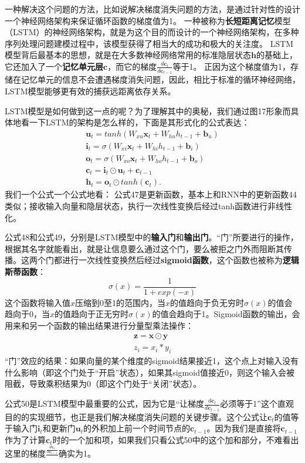 \documentclass[10pt,a4paper]{ctexart}
\begin{document}
一种解决这个问题的方法，比如说解决梯度消失问题的方法，是通过针对性的设计一个神经网络架构来保证循环函数的梯度值为1。
一种被称为\textbf{长短距离记忆}模型（LSTM）的神经网络架构，就是为这个目的而设计的一个神经网络架构，在多种序列处理问题建模过程中，该模型获得了相当大的成功和极大的关注度。
LSTM模型背后最基本的思想，就是在大多数神经网络常用的标准隐层状态$\textbf{h}$的基础上，它还加入了一个\textbf{记忆单元层}$\textbf{c}$，而它的梯度$\frac{d\textbf{c}_t}{d\textbf{c}_{t-1}}$等于1。
正因为这个梯度值为1，存储在记忆单元的信息不会遭遇梯度消失问题，因此，相比于标准的循环神经网络，LSTM模型能够更有效的捕获远距离依存关系。

LSTM模型是如何做到这一点的呢？为了理解其中的奥秘，我们通过图17形象而具体地看一下LSTM的架构是怎么样的，下面是其形式化的公式表达：
\[
 \begin{array}{l}
 \textbf{u}_t = tanh(W_{xu}\textbf{x}_t + W_{hu}h_{t-1} + \textbf{b}_u) \\
 \textbf{i}_t = \sigma (W_{xi}\textbf{x}_t + W_{hi}h_{t-1} + \textbf{b}_i) \\
 \textbf{o}_t = \sigma (W_{xo}\textbf{x}_t + W_{ho}h_{t-1} + \textbf{b}_o) \\
 \textbf{c}_t = \textbf{i}_t \odot \textbf{u}_t + \textbf{c}_{t-1} \\
 \textbf{h}_t = \textbf{o}_t \odot tanh(\textbf{c}_t).
 \end{array}
\]
我们一个公式一个公式地看：
公式47是更新函数，基本上和RNN中的更新函数44类似；接收输入向量和隐层状态，执行一次线性变换后经过tanh函数进行非线性化。

公式48和公式49，分别是LSTM模型中的\textbf{输入门}和\textbf{输出门}。“门”所要进行的操作，根据其名字就能看出，就是让信息要么通过这个门，要么被拒之门外而阻断其传播。这两个门都进行一次线性变换然后经过\textbf{sigmoid函数}，这个函数也被称为\textbf{逻辑斯蒂函数}：
\[
 \sigma (x) = \frac{1}{1 + exp(-x)}
\]
这个函数将输入值$x$压缩到0至1的范围内，当$x$的值趋向于负无穷时$\sigma(x)$的值会趋向于0，当$x$的值趋向于正无穷时$\sigma(x)$的值会趋向于1。Sigmoid函数的输出，会用来和另一个函数的输出结果进行分量型乘法操作：
\[
 \begin{array}{l}
 \textbf{z} = \textbf{x} \odot \textbf{y} \\
 z_i = x_i * y_i
 \end{array}
\]
“门”效应的结果：如果向量的某个维度的sigmoid结果接近1，这个点上对输入没有什么影响（即这个门处于“开启”状态），如果其sigmoid值接近0，则这个输入会被阻截，导致乘积结果为0（即这个门处于“关闭”状态）。

公式50是LSTM模型中最重要的公式，因为它是“让梯度$\frac{d\textbf{c}_t}{d\textbf{c}_{t-1}}$必须等于1”这个直观目的的实现细节，也正是我们解决梯度消失问题的关键步骤。这个公式让$\textbf{c}_t$的值等于输入门$\textbf{i}_t$和更新门$\textbf{u}_t$的外积加上前一个时间节点的$\textbf{c}_{t-1}$。因为我们是直接将$\textbf{c}_{t-1}$作为了计算$\textbf{c}_t$时的一个加和项，如果我们只看公式50中的这个加和部分，不难看出这里的梯度$\frac{\frac{d\textbf{c}_t}{d\textbf{c}_{t-1}}}{}$确实为1。
\end{document}
